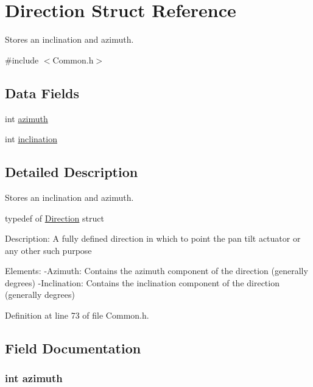 \hypertarget{struct_direction}{\section{Direction Struct Reference}
\label{struct_direction}
}


Stores an inclination and azimuth.  




{\ttfamily \#include $<$Common.\+h$>$}

\subsection*{Data Fields}
\begin{DoxyCompactItemize}
\item 
int \hyperlink{struct_direction_a866e78e12cb32dcaf1ded89bda8be8f5}{azimuth}
\item 
int \hyperlink{struct_direction_af308b9934394c8bcf7614eb1df2d863f}{inclination}
\end{DoxyCompactItemize}


\subsection{Detailed Description}
Stores an inclination and azimuth. 



 typedef of \hyperlink{struct_direction}{Direction} struct

Description\+: A fully defined direction in which to point the pan tilt actuator or any other such purpose

Elements\+: -\/\+Azimuth\+: Contains the azimuth component of the direction (generally degrees) -\/\+Inclination\+: Contains the inclination component of the direction (generally degrees) 

Definition at line 73 of file Common.\+h.



\subsection{Field Documentation}
\hypertarget{struct_direction_a866e78e12cb32dcaf1ded89bda8be8f5}{
\subsubsection[{azimuth}]{\setlength{\rightskip}{0pt plus 5cm}int azimuth}}\label{struct_direction_a866e78e12cb32dcaf1ded89bda8be8f5}



